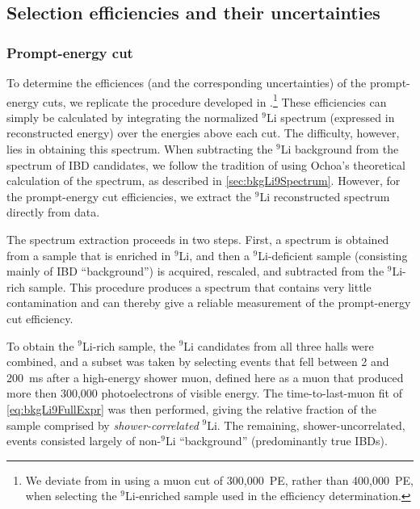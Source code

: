 \documentclass[../thesis.tex]{subfiles}
\begin{document}
\subsection{Selection efficiencies and their uncertainties}
\label{sec:bkgLi9SelEffs}

\subsubsection{Prompt-energy cut}
\label{sec:bkgLi9PromptCutEff}

To determine the efficiences (and the corresponding uncertainties) of the prompt-energy cuts, we replicate the procedure developed in \cite{ChrisLi9}.\footnote{We deviate from \cite{ChrisLi9} in using a muon cut of 300,000~PE, rather than 400,000~PE, when selecting the $^9$Li-enriched sample used in the efficiency determination.} These efficiencies can simply be calculated by integrating the normalized $^9$Li spectrum (expressed in reconstructed energy) over the energies above each cut. The difficulty, however, lies in obtaining this spectrum. When subtracting the $^9$Li background from the spectrum of IBD candidates, we follow the tradition of using Ochoa's theoretical calculation of the spectrum, as described in \autoref{sec:bkgLi9Spectrum}. However, for the prompt-energy cut efficiencies, we extract the $^9$Li reconstructed spectrum directly from data.

The spectrum extraction proceeds in two steps. First, a spectrum is obtained from a sample that is enriched in $^9$Li, and then a $^9$Li-deficient sample (consisting mainly of IBD ``background'') is acquired, rescaled, and subtracted from the $^9$Li-rich sample. This procedure produces a spectrum that contains very little contamination and can thereby give a reliable measurement of the prompt-energy cut efficiency.

To obtain the $^9$Li-rich sample, the $^9$Li candidates from all three halls were combined, and a subset was taken by selecting events that fell between 2 and 200~ms after a high-energy shower muon, defined here as a muon that produced more then 300,000 photoelectrons of visible energy. The time-to-last-muon fit of \autoref{eq:bkgLi9FullExpr} was then performed, giving the relative fraction of the sample comprised by \emph{shower-correlated} $^9$Li. The remaining, shower-uncorrelated, events consisted largely of non-$^9$Li ``background'' (predominantly true IBDs).
\end{document}
